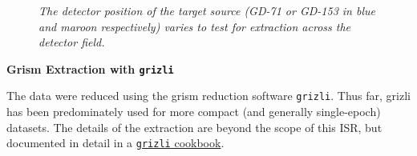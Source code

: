 \documentclass[12pt]{article}
\begin{document}
{{%
\begin{figure}[h!]
	\caption{\textit{The detector position of the target source (GD-71 or GD-153 in blue and maroon
	respectively) varies to test for extraction across the detector field.}}
\label{fig:detector_pos}
\end{figure}

{\bf Grism Extraction with \texttt{grizli}}

The data were reduced using the grism reduction software \texttt{grizli}. Thus far, grizli 
has been predominately used for more compact (and generally single-epoch) datasets. The details of the
extraction are beyond the scope of this ISR, but documented in detail in a 
\href{http://grizli-calibration.readthedocs.io/en/latest/}{\color{blue} \texttt{grizli} cookbook}.

}}
\end{document}

